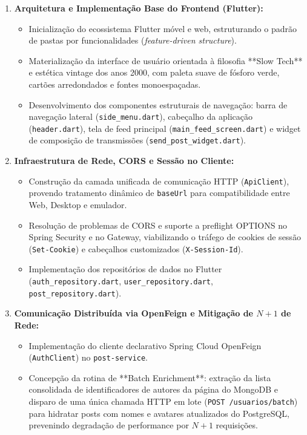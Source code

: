 \documentclass[12pt,a4paper]{report}
\begin{document}
\begin{enumerate}
    \item \textbf{Arquitetura e Implementação Base do Frontend (Flutter):}
    \begin{itemize}
        \item Inicialização do ecossistema Flutter móvel e web, estruturando o padrão de pastas por funcionalidades (\textit{feature-driven structure}).
        \item Materialização da interface de usuário orientada à filosofia **Slow Tech** e estética vintage dos anos 2000, com paleta suave de fósforo verde, cartões arredondados e fontes monoespaçadas.
        \item Desenvolvimento dos componentes estruturais de navegação: barra de navegação lateral (\texttt{side\_menu.dart}), cabeçalho da aplicação (\texttt{header.dart}), tela de feed principal (\texttt{main\_feed\_screen.dart}) e widget de composição de transmissões (\texttt{send\_post\_widget.dart}).
    \end{itemize}
    \item \textbf{Infraestrutura de Rede, CORS e Sessão no Cliente:}
    \begin{itemize}
        \item Construção da camada unificada de comunicação HTTP (\texttt{ApiClient}), provendo tratamento dinâmico de \texttt{baseUrl} para compatibilidade entre Web, Desktop e emulador.
        \item Resolução de problemas de CORS e suporte a preflight OPTIONS no Spring Security e no Gateway, viabilizando o tráfego de cookies de sessão (\texttt{Set-Cookie}) e cabeçalhos customizados (\texttt{X-Session-Id}).
        \item Implementação dos repositórios de dados no Flutter (\texttt{auth\_repository.dart}, \texttt{user\_repository.dart}, \texttt{post\_repository.dart}).
    \end{itemize}
    \item \textbf{Comunicação Distribuída via OpenFeign e Mitigação de $N+1$ de Rede:}
    \begin{itemize}
        \item Implementação do cliente declarativo Spring Cloud OpenFeign (\texttt{AuthClient}) no \texttt{post-service}.
        \item Concepção da rotina de **Batch Enrichment**: extração da lista consolidada de identificadores de autores da página do MongoDB e disparo de uma única chamada HTTP em lote (\texttt{POST /usuarios/batch}) para hidratar posts com nomes e avatares atualizados do PostgreSQL, prevenindo degradação de performance por $N+1$ requisições.

\end{itemize}
\end{enumerate}
\end{document}
